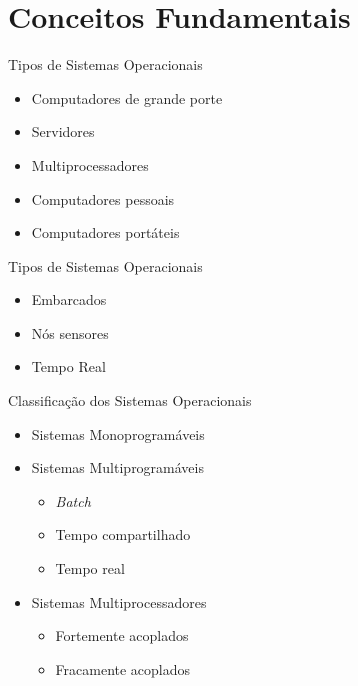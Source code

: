 \documentclass[aspectratio=169,
				xcolor=table]{beamer}
\begin{document}
	\section{Conceitos Fundamentais}
	
	\begin{frame}{Tipos de Sistemas Operacionais}
	\begin{itemize}
		\item Computadores de grande porte			
		\vspace{0.45em}
		\item Servidores					
		\vspace{0.45em}
		\item Multiprocessadores			
		\vspace{0.45em}
		\item Computadores pessoais
		\vspace{0.45em}		
		\item Computadores portáteis
		
	\end{itemize}
	\end{frame}

	\begin{frame}{Tipos de Sistemas Operacionais}
	\begin{itemize}
		\item Embarcados
		\vspace{0.45em}
		\item Nós sensores
		\vspace{0.45em}
		\item Tempo Real
		
	\end{itemize}
	\end{frame}	
	
	\begin{frame}{Classificação dos Sistemas Operacionais}
		\begin{itemize}
			\item Sistemas Monoprogramáveis
			\vspace{1em}
			\item Sistemas Multiprogramáveis
			\begin{itemize}
				\item \textit{Batch}
				\item Tempo compartilhado
				\item Tempo real
			\end{itemize}
			\vspace{1em}
			\item Sistemas Multiprocessadores
			\begin{itemize}
				\item Fortemente acoplados
				\item Fracamente acoplados
			\end{itemize}
		\end{itemize}
	\end{frame}
	
\end{document}
